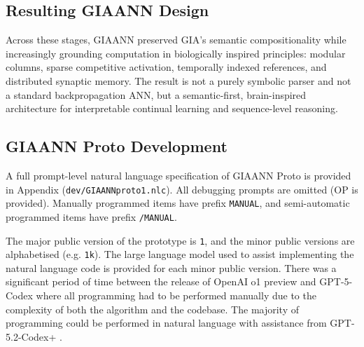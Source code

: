 \subsection{Resulting GIAANN Design}

Across these stages, GIAANN preserved GIA's semantic compositionality while increasingly grounding
computation in biologically inspired principles: modular columns, sparse competitive activation,
temporally indexed references, and distributed synaptic memory. The result is not a purely symbolic
parser and not a standard backpropagation ANN, but a semantic-first, brain-inspired architecture for
interpretable continual learning and sequence-level reasoning.

\subsection{GIAANN Proto Development}

A full prompt-level natural language specification of GIAANN Proto is provided in Appendix  (\texttt{dev/GIAANNproto1.nlc}). All debugging prompts are omitted (OP is provided). Manually programmed items have prefix \texttt{MANUAL}, and semi-automatic programmed items have prefix \texttt{/MANUAL}.

The major public version of the prototype is \texttt{1}, and the minor public versions are alphabetised (e.g. \texttt{1k}). The large language model used to assist implementing the natural language code is provided for each minor public version. There was a significant period of time between the release of OpenAI o1 preview \citep{openai2024o1preview} and GPT-5-Codex \citep{openai2025gpt5codex, openai2025gpt51codex} where all programming had to be performed manually due to the complexity of both the algorithm and the codebase. The majority of programming could be performed in natural language with assistance from GPT-5.2-Codex+ \citep{openai2025gpt52codex, openai2026gpt53codex, openai2026gpt54codex}.